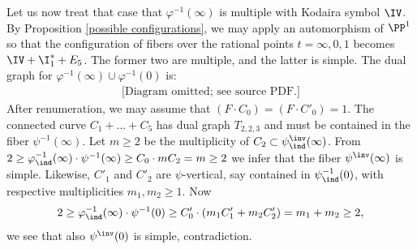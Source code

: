 Let us now treat that case that  $\varphi^{-1}(\infty)$ is multiple with Kodaira symbol $\IV$.
By  Proposition \ref{possible configurations},  we may apply an automorphism of $\PP^1$ so that
the  configuration of fibers over the rational points $t=\infty,0,1$
becomes $\IV+\I_1^*+E_5$. The former two are multiple, and the latter is simple.
The dual graph for $\varphi^{-1}(\infty)\cup\varphi^{-1}(0)$ is:
\begin{equation*}
\begin{gathered}
\text{[Diagram omitted; see source PDF.]}
\end{gathered}
\end{equation*}
After renumeration, we may assume  that $(F\cdot C_0)=(F\cdot C'_0)=1$.
The   connected curve  $C_1+\ldots+C_5$ has dual graph $T_{2,2,3}$ and must be contained in   the fiber $\psi^{-1}(\infty)$.
Let $m\geq 2 $ be the multiplicity of $C_2\subset \psi^\inv_\ind(\infty)$.
From $2\geq \varphi^{-1}_\ind(\infty)\cdot \psi^{-1}(\infty)\geq C_0\cdot mC_2=m\geq 2$ we infer that the fiber $\psi^\inv(\infty)$
is simple. Likewise, $C'_1$ and $C'_2$ are $\psi$-vertical, say contained in $\psi_\ind^{-1}(0)$, with respective multiplicities $m_1,m_2\geq 1$.
Now
$$
2\geq \varphi^{-1}_\ind(\infty)\cdot \psi^{-1}(0)\geq C'_0\cdot (m_1C'_1+m_2C'_2) =m_1+m_2\geq 2,
$$
we see that  also $\psi^\inv(0)$ is simple, contradiction.
%
%
